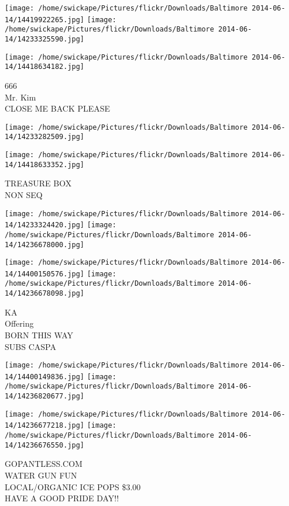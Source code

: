 \documentclass[10pt,letterpaper]{article}
\begin{document}
\texttt{[image: /home/swickape/Pictures/flickr/Downloads/Baltimore 2014-06-14/14419922265.jpg]}
\texttt{[image: /home/swickape/Pictures/flickr/Downloads/Baltimore 2014-06-14/14233325590.jpg]}

\vspace{0.25in}
\texttt{[image: /home/swickape/Pictures/flickr/Downloads/Baltimore 2014-06-14/14418634182.jpg]}

666\\
Mr. Kim\\
CLOSE ME BACK PLEASE\\
\pagebreak

\texttt{[image: /home/swickape/Pictures/flickr/Downloads/Baltimore 2014-06-14/14233282509.jpg]}

\vspace{0.25in}
\texttt{[image: /home/swickape/Pictures/flickr/Downloads/Baltimore 2014-06-14/14418633352.jpg]}

TREASURE BOX\\
NON SEQ\\
\pagebreak

\texttt{[image: /home/swickape/Pictures/flickr/Downloads/Baltimore 2014-06-14/14233324420.jpg]}
\texttt{[image: /home/swickape/Pictures/flickr/Downloads/Baltimore 2014-06-14/14236678000.jpg]}

\texttt{[image: /home/swickape/Pictures/flickr/Downloads/Baltimore 2014-06-14/14400150576.jpg]}
\texttt{[image: /home/swickape/Pictures/flickr/Downloads/Baltimore 2014-06-14/14236678098.jpg]}

KA\\
Offering\\
BORN THIS WAY\\
SUBS CASPA\\
\pagebreak

\texttt{[image: /home/swickape/Pictures/flickr/Downloads/Baltimore 2014-06-14/14400149836.jpg]}
\texttt{[image: /home/swickape/Pictures/flickr/Downloads/Baltimore 2014-06-14/14236820677.jpg]}

\texttt{[image: /home/swickape/Pictures/flickr/Downloads/Baltimore 2014-06-14/14236677218.jpg]}
\texttt{[image: /home/swickape/Pictures/flickr/Downloads/Baltimore 2014-06-14/14236676550.jpg]}

GOPANTLESS.COM\\
WATER GUN FUN\\
LOCAL/ORGANIC ICE POPS \$3.00\\
HAVE A GOOD PRIDE DAY!!\\
\pagebreak
\end{document}
